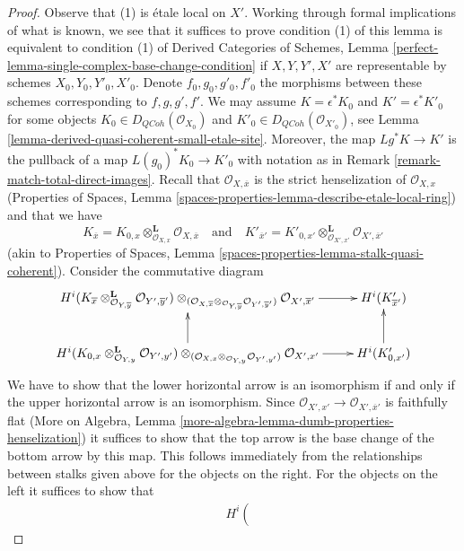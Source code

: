 \documentclass[10pt,a4paper]{amsart}
\theoremstyle{plain}
\theoremstyle{definition}
\theoremstyle{remark}
\numberwithin{equation}{subsection}
\def\QCoh{\mathit{QCoh}}
\begin{document}
\begin{proof}
Observe that (1) is \'etale local on $X'$. Working through formal
implications of what is known, we see that it suffices to prove
condition (1) of this lemma is equivalent to condition
(1) of Derived Categories of Schemes, Lemma
\ref{perfect-lemma-single-complex-base-change-condition}
if $X, Y, Y', X'$ are representable by schemes
$X_0, Y_0, Y'_0, X'_0$. Denote $f_0, g_0, g'_0, f'_0$ the
morphisms between these schemes corresponding to $f, g, g', f'$.
We may assume $K = \epsilon^*K_0$ and $K' = \epsilon^*K'_0$
for some objects $K_0 \in D_\QCoh(\mathcal{O}_{X_0})$
and $K'_0 \in D_\QCoh(\mathcal{O}_{X'_0})$, see
Lemma \ref{lemma-derived-quasi-coherent-small-etale-site}.
Moreover, the map $Lg^*K \to K'$ is the pullback
of a map $L(g_0)^*K_0 \to K'_0$ with notation as in
Remark \ref{remark-match-total-direct-images}.
Recall that $\mathcal{O}_{X, \overline{x}}$ is the
strict henselization of $\mathcal{O}_{X, x}$
(Properties of Spaces, Lemma
\ref{spaces-properties-lemma-describe-etale-local-ring})
and that we have
$$
K_{\overline{x}} =
K_{0, x} \otimes_{\mathcal{O}_{X, x}}^\mathbf{L} \mathcal{O}_{X, \overline{x}}
\quad\text{and}\quad
K'_{\overline{x}'} =
K'_{0, x'} \otimes_{\mathcal{O}_{X', x'}}^\mathbf{L}
\mathcal{O}_{X', \overline{x}'}
$$
(akin to Properties of Spaces, Lemma
\ref{spaces-properties-lemma-stalk-quasi-coherent}).
Consider the commutative diagram
$$
\xymatrix{
H^i(K_{\overline{x}}
\otimes_{\mathcal{O}_{Y, \overline{y}}}^\mathbf{L}
\mathcal{O}_{Y', \overline{y}'})
\otimes_{(\mathcal{O}_{X, \overline{x}}
\otimes_{\mathcal{O}_{Y, \overline{y}}}
\mathcal{O}_{Y', \overline{y}'})}
\mathcal{O}_{X', \overline{x}'}
\ar[r] &
H^i(K'_{\overline{x}'}) \\
H^i(K_{0, x} \otimes_{\mathcal{O}_{Y, y}}^\mathbf{L} \mathcal{O}_{Y', y'})
\otimes_{(\mathcal{O}_{X, x} \otimes_{\mathcal{O}_{Y, y}} \mathcal{O}_{Y', y'})}
\mathcal{O}_{X', x'}
\ar[u] \ar[r] &
H^i(K'_{0, x'}) \ar[u]
}
$$
We have to show that the lower horizontal arrow is an isomorphism if and only
if the upper horizontal arrow is an isomorphism. Since
$\mathcal{O}_{X', x'} \to \mathcal{O}_{X', \overline{x}'}$
is faithfully flat (More on Algebra, Lemma
\ref{more-algebra-lemma-dumb-properties-henselization})
it suffices to show that the top arrow is the base
change of the bottom arrow by this map.
This follows immediately from the relationships between
stalks given above for the objects on the right.
For the objects on the left it suffices to show that
\begin{align*}
&
H^i\left(

\end{align*}
\end{proof}
\end{document}
